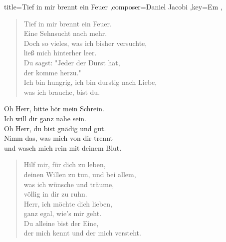 \documentclass[]{leadsheet}
\begin{document}
\begin{song}{title={Tief in mir brennt ein Feuer
},composer={Daniel Jacobi
},key={Em
},}
\begin{verse}
Tief in mir brennt ein Feuer. \\
Eine Sehnsucht nach mehr. \\
Doch so vieles, was ich bisher versuchte, \\
ließ mich hinterher leer. \\
Du sagst: "Jeder der Durst hat, \\
der komme herzu." \\
Ich bin hungrig, ich bin durstig nach Liebe, \\
was ich brauche, bist du. \\
\end{verse}

\begin{chorus}
Oh Herr, bitte hör mein Schrein. \\
Ich will dir ganz nahe sein. \\
Oh Herr, du bist gnädig und gut. \\
Nimm das, was mich von dir trennt \\
und wasch mich rein mit deinem Blut. \\
\end{chorus}

\begin{verse}
Hilf mir, für dich zu leben, \\
deinen Willen zu tun, und bei allem, \\
was ich wünsche und träume, \\
völlig in dir zu ruhn. \\
Herr, ich möchte dich lieben, \\
ganz egal, wie's mir geht. \\
Du alleine bist der Eine, \\
der mich kennt und der mich versteht. \\
\end{verse}

\end{song}
\end{document}
